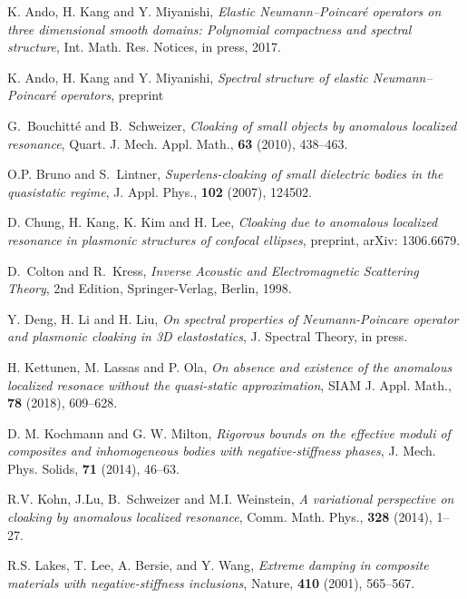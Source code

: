 \documentclass[11pt,reqno,twoside]{amsart}
\theoremstyle{definition}
\theoremstyle{remark}
\numberwithin{equation}{section}
\begin{document}
\begin{thebibliography}{99}
 {K. Ando, H. Kang and Y. Miyanishi}, {\it Elastic Neumann--Poincar\'e operators on three dimensional smooth domains: Polynomial compactness and spectral structure}, Int. Math. Res. Notices, in press, 2017.

 {K. Ando, H. Kang and Y. Miyanishi}, {\it Spectral structure of elastic Neumann--Poincar\'e operators}, preprint

G.~Bouchitt\'{e} and B.~Schweizer, \emph{Cloaking of small objects by anomalous localized resonance}, Quart. J. Mech. Appl. Math., \textbf{63} (2010), 438--463.

 O.P. Bruno and S.~Lintner, \emph{Superlens-cloaking of small dielectric bodies in the quasistatic regime}, J. Appl. Phys., \textbf{102} (2007), 124502.

  D. Chung, H. Kang, K. Kim and H. Lee, {\it Cloaking due to anomalous localized resonance in plasmonic structures of confocal ellipses}, preprint, arXiv: 1306.6679.

  {D.~Colton and R.~Kress}, {\it Inverse
Acoustic and Electromagnetic Scattering Theory}, 2nd Edition,
Springer-Verlag, Berlin, 1998.

  Y. Deng, H. Li and H. Liu, {\it On spectral properties of Neumann-Poincare operator and plasmonic cloaking in 3D elastostatics}, J. Spectral Theory, in press. 

 H. Kettunen, M. Lassas and P. Ola, {\it On absence and existence of the anomalous localized resonace without the quasi-static approximation}, SIAM J. Appl. Math., {\bf 78} (2018), 609--628. 

 {D. M. Kochmann and G. W. Milton}, \emph{Rigorous bounds on the effective moduli of
composites and inhomogeneous bodies with negative-stiffness phases}, J. Mech. Phys.
Solids, {\bf 71} (2014), 46--63.

 {R.V. Kohn, J.Lu, B.~Schweizer and M.I. Weinstein}, \emph{A variational
  perspective on cloaking by anomalous localized resonance}, Comm. Math. Phys., {\bf 328} (2014), 1--27.


 {R.S. Lakes, T. Lee, A. Bersie, and Y. Wang}, \emph{Extreme damping in composite materials
with negative-stiffness inclusions}, Nature, {\bf 410} (2001), 565--567.


\end{thebibliography}
\end{document}
